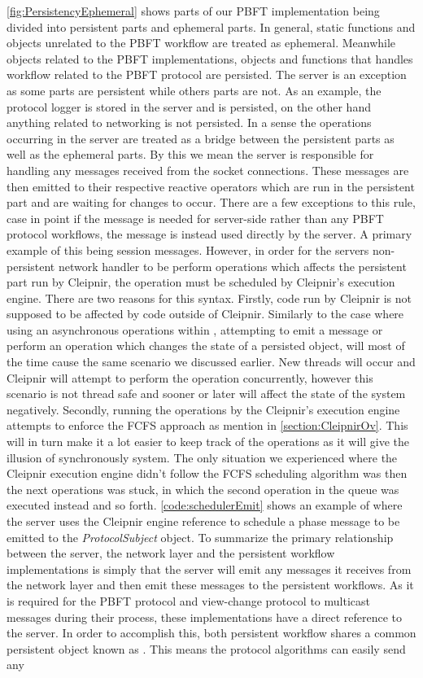 \autoref{fig:PersistencyEphemeral} shows parts of our PBFT implementation being divided into persistent parts and ephemeral parts. In general, static functions and objects unrelated to the PBFT workflow are treated as ephemeral. Meanwhile objects related to the PBFT implementations,  objects and functions that handles workflow related to the PBFT protocol are persisted. The server is an exception as some parts are persistent while others parts are not. As an example, the protocol logger is stored in the server and is persisted, on the other hand anything related to networking is not persisted. In a sense the operations occurring in the server are treated as a bridge between the persistent parts as well as the ephemeral parts. By this we mean the server is responsible for handling any messages received from the socket connections. These messages are then emitted to their respective reactive operators which are run in the persistent part and are waiting for changes to occur. There are a few exceptions to this rule, case in point if the message is needed for server-side rather than any PBFT protocol workflows, the message is instead used directly by the server. A primary example of this being session messages. However, in order for the servers non-persistent network handler to be perform operations which affects the persistent part run by Cleipnir, the operation must be scheduled by Cleipnir's execution engine. There are two reasons for this syntax. Firstly, code run by Cleipnir is not supposed to be affected by code outside of Cleipnir. Similarly to the case where using an asynchronous operations within , attempting to emit a message or perform an operation which changes the state of a persisted object, will most of the time cause the same scenario we discussed earlier. New threads will occur and Cleipnir will attempt to perform the operation concurrently, however this scenario is not thread safe and sooner or later will affect the state of the system negatively. Secondly, running the operations by the Cleipnir's execution engine attempts to enforce the FCFS approach as mention in \autoref{section:CleipnirOv}. This will in turn make it a lot easier to keep track of the operations as it will give the illusion of synchronously system. The only situation we experienced where the Cleipnir execution engine didn't follow the FCFS scheduling algorithm was then the next operations was stuck, in which the second operation in the queue was executed instead and so forth. \autoref{code:schedulerEmit} shows an example of where the server uses the Cleipnir engine reference to schedule a phase message to be emitted to the \emph{ProtocolSubject}  object. To summarize the primary relationship between the server, the network layer and the persistent workflow implementations is simply that the server will emit any messages it receives from the network layer and then emit these messages to the persistent workflows. As it is required for the PBFT protocol and view-change protocol to multicast messages during their process, these implementations have a direct reference to the server. In order to accomplish this, both persistent workflow shares a common persistent object known as . This means the protocol algorithms can easily send any 